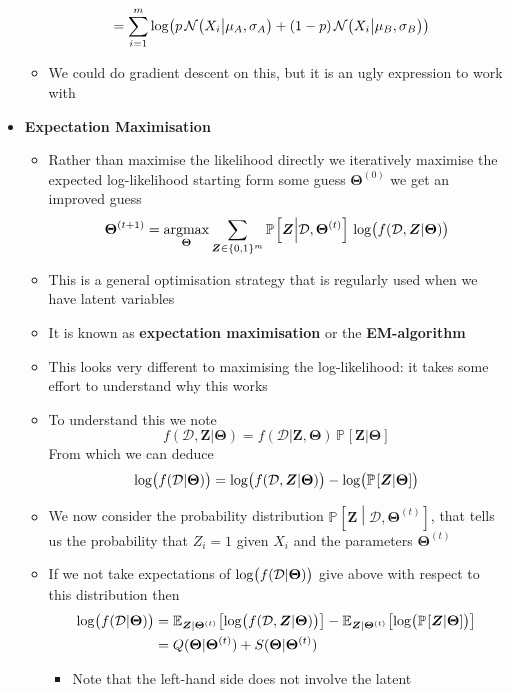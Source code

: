 \documentclass[11pt]{article}
\newcommand{\av}[2][]{\mathbb{E}_{#1\!}\left[ #2 \right]}
\newcommand{\Prob}[2][]{\mathbb{P}_{#1\!}\left[ #2 \right]}
\newcommand{\logg}[1]{\log\!\left( \strut#1 \right)}
\newcommand{\normal}[2]{\mathcal{N}\!\left(#1 \big| #2 \right)}
\begin{document}
\begin{itemize}
\begin{itemize}
\begin{align*}
 &=\sum_{i=1}^m
\logg{p\,\normal{X_i}{\mu_A,\sigma_A}+(1-p)\,\normal{X_i}{\mu_B,\sigma_B}}
\end{align*}
\item We could do gradient descent on this, but it is an ugly
expression to work with
\end{itemize}
\item \textbf{Expectation Maximisation}
\begin{itemize}
\item Rather than maximise the likelihood directly we iteratively
maximise the expected log-likelihood starting form some guess
\(\bm{\Theta}^{(0)}\) we get an improved guess
$$ \bm{\Theta}^{(t+1)} = \mathop{\mathrm{argmax}}_{\bm{\Theta}}
       \sum_{\bm{Z}\in\{0,1\}^m} \Prob{\bm{Z}\middle|\mathcal{D},\bm{\Theta}^{(t)}}\,
       \logg{f(\mathcal{D},\bm{Z} | \bm{\Theta})} $$
\item This is a general optimisation strategy that is regularly used
when we have latent variables
\item It is known as \textbf{expectation maximisation} or the \textbf{EM-algorithm}
\item This looks very different to maximising the log-likelihood: it
takes some effort to understand why this works
\item To understand this we note
$$f(\mathcal{D},\bm{Z}|\bm{\Theta}) =
       f(\mathcal{D}|\bm{Z},\bm{\Theta}) \, \Prob{\bm{Z}|\bm{\Theta}}  $$
From which we can deduce
$$ \logg{f(\mathcal{D}|\bm{\Theta})} = \logg{f(\mathcal{D},\bm{Z}|\bm{\Theta})} - \logg{\Prob{\bm{Z}|\bm{\Theta}} } $$
\item We now consider the probability distribution
\(\Prob{\bm{Z}\middle|\mathcal{D},\bm{\Theta}^{(t)}}\), that
tells us the probability that \(Z_i=1\) given \(X_i\) and the
parameters \(\bm{\Theta}^{(t)}\)
\item If we not take expectations of
\(\logg{f(\mathcal{D}|\bm{\Theta})}\) give above with respect to
this distribution then
\begin{align*}
  \logg{f(\mathcal{D}|\bm{\Theta})}
   &= \av[\bm{Z}|\bm{\Theta}^{(t)}]{\logg{f(\mathcal{D},\bm{Z}|\bm{\Theta})}}
- \av[\bm{Z}|\bm{\Theta}^{(t)}]{\logg{\Prob{\bm{Z}|\bm{\Theta}} }}
  \\
  &= Q(\bm{\Theta}|\bm{\Theta}^{(t)}) +
  S(\bm{\Theta}|\bm{\Theta}^{(t)})
\end{align*}
\begin{itemize}
\item Note that the left-hand side does not involve the latent

\end{itemize}
\end{itemize}
\end{itemize}
\end{document}
